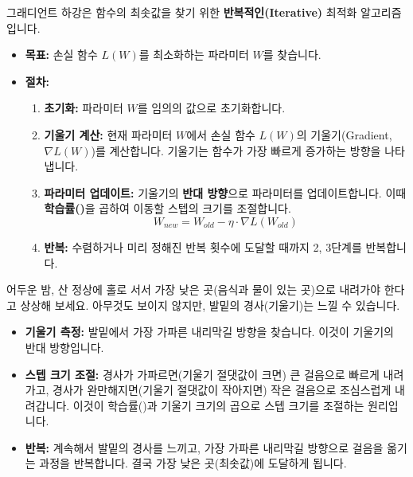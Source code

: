 \documentclass[11pt,a4paper]{book}
\theoremstyle{definition}
\begin{document}
\begin{tcolorbox}[summary, title={그래디언트 하강(Gradient Descent)의 핵심}] %
그래디언트 하강은 함수의 최솟값을 찾기 위한 \textbf{반복적인(Iterative)} 최적화 알고리즘입니다.
\begin{itemize}
    \item \textbf{목표:} 손실 함수 $L(W)$를 최소화하는 파라미터 $W$를 찾습니다.
    \item \textbf{절차:}
    \begin{enumerate}
        \item \textbf{초기화:} 파라미터 $W$를 임의의 값으로 초기화합니다.
        \item \textbf{기울기 계산:} 현재 파라미터 $W$에서 손실 함수 $L(W)$의 기울기(Gradient, $\nabla L(W)$)를 계산합니다. 기울기는 함수가 가장 빠르게 증가하는 방향을 나타냅니다.
        \item \textbf{파라미터 업데이트:} 기울기의 \textbf{반대 방향}으로 파라미터를 업데이트합니다. 이때 \textbf{학습률(\texttt{\eta})}을 곱하여 이동할 스텝의 크기를 조절합니다.
        \[ W_{new} = W_{old} - \eta \cdot \nabla L(W_{old}) \]
        \item \textbf{반복:} 수렴하거나 미리 정해진 반복 횟수에 도달할 때까지 2, 3단계를 반복합니다.
    \end{enumerate}
\end{itemize}
\end{tcolorbox}

\begin{tcolorbox}[example, title={그래디언트 하강 비유: 어두운 산에서 하산하기}] %
어두운 밤, 산 정상에 홀로 서서 가장 낮은 곳(음식과 물이 있는 곳)으로 내려가야 한다고 상상해 보세요. 아무것도 보이지 않지만, 발밑의 경사(기울기)는 느낄 수 있습니다.
\begin{itemize}
    \item \textbf{기울기 측정:} 발밑에서 가장 가파른 내리막길 방향을 찾습니다. 이것이 기울기의 반대 방향입니다.
    \item \textbf{스텝 크기 조절:} 경사가 가파르면(기울기 절댓값이 크면) 큰 걸음으로 빠르게 내려가고, 경사가 완만해지면(기울기 절댓값이 작아지면) 작은 걸음으로 조심스럽게 내려갑니다. 이것이 학습률(\texttt{\eta})과 기울기 크기의 곱으로 스텝 크기를 조절하는 원리입니다.
    \item \textbf{반복:} 계속해서 발밑의 경사를 느끼고, 가장 가파른 내리막길 방향으로 걸음을 옮기는 과정을 반복합니다. 결국 가장 낮은 곳(최솟값)에 도달하게 됩니다.
\end{itemize}
\end{tcolorbox}
\end{document}
